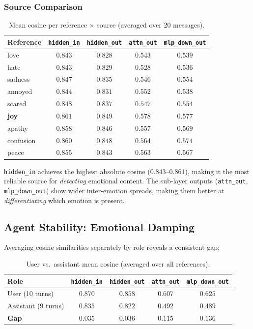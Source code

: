 \documentclass[11pt,a4paper]{article}
\begin{document}
\subsubsection{Source Comparison}

\begin{table}[H]
\centering
\caption{Mean cosine per reference $\times$ source (averaged over 20 messages).}
\label{tab:sources}
\small
\begin{tabular}{@{}lcccc@{}}
\toprule
Reference & \texttt{hidden\_in} & \texttt{hidden\_out} & \texttt{attn\_out} & \texttt{mlp\_down\_out} \\
\midrule
love & $0.843$ & $0.828$ & $0.543$ & $0.539$ \\
hate & $0.843$ & $0.829$ & $0.528$ & $0.536$ \\
sadness & $0.847$ & $0.835$ & $0.546$ & $0.554$ \\
annoyed & $0.844$ & $0.831$ & $0.552$ & $0.538$ \\
scared & $0.848$ & $0.837$ & $0.547$ & $0.554$ \\
\textbf{joy} & $\mathbf{0.861}$ & $\mathbf{0.849}$ & $\mathbf{0.578}$ & $\mathbf{0.577}$ \\
apathy & $0.858$ & $0.846$ & $0.557$ & $0.569$ \\
confusion & $0.860$ & $0.848$ & $0.564$ & $0.574$ \\
peace & $0.855$ & $0.843$ & $0.563$ & $0.567$ \\
\bottomrule
\end{tabular}
\end{table}

\texttt{hidden\_in} achieves the highest absolute cosine ($0.843$--$0.861$), making it the most reliable source for \emph{detecting} emotional content. The sub-layer outputs (\texttt{attn\_out}, \texttt{mlp\_down\_out}) show wider inter-emotion spreads, making them better at \emph{differentiating} which emotion is present.

\subsection{Agent Stability: Emotional Damping}

Averaging cosine similarities separately by role reveals a consistent gap:

\begin{table}[H]
\centering
\caption{User vs.\ assistant mean cosine (averaged over all references).}
\label{tab:damping}
\small
\begin{tabular}{@{}lcccc@{}}
\toprule
Role & \texttt{hidden\_in} & \texttt{hidden\_out} & \texttt{attn\_out} & \texttt{mlp\_down\_out} \\
\midrule
User (10 turns) & $0.870$ & $0.858$ & $0.607$ & $0.625$ \\
Assistant (9 turns) & $0.835$ & $0.822$ & $0.492$ & $0.489$ \\
\midrule
\textbf{Gap} & $\mathbf{0.035}$ & $\mathbf{0.036}$ & $\mathbf{0.115}$ & $\mathbf{0.136}$ \\
\bottomrule
\end{tabular}
\end{table}
\end{document}
